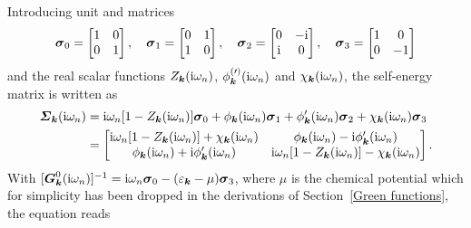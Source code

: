 Introducing unit and  matrices
%
\begin{equation*}
    \boldsymbol \sigma_0 =
    \begin{bmatrix}
        1 & 0 \\
        0 & 1
    \end{bmatrix},
    \quad
    \boldsymbol \sigma_1 =
    \begin{bmatrix}
        0 & 1 \\
        1 & 0
    \end{bmatrix},
    \quad
    \boldsymbol \sigma_2 =
    \begin{bmatrix}
        0 & -\mathrm i \\
        \mathrm i & 0
    \end{bmatrix},
    \quad
    \boldsymbol \sigma_3 =
    \begin{bmatrix}
    1 & 0 \\
    0 & -1
    \end{bmatrix}
\end{equation*}
%
and the real scalar functions $Z_{\boldsymbol k}(\mathrm i \omega_n)$, $\phi^{(\prime)}_{\boldsymbol
k}(\mathrm i \omega_n)$ and $\chi_{\boldsymbol k}(\mathrm i \omega_n)$, the self-energy matrix is
written as
%
\begin{align} \label{self-energy matrix}
    \boldsymbol {\varSigma}_{\boldsymbol k}(\mathrm i \omega_n) &= \mathrm i \omega_n
    [1 - Z_{\boldsymbol k}(\mathrm i \omega_n)] \boldsymbol \sigma_0
    + \phi _{\boldsymbol k}(\mathrm i \omega_n) \boldsymbol \sigma_1
    + \phi'_{\boldsymbol k}(\mathrm i \omega_n) \boldsymbol \sigma_2
    + \chi _{\boldsymbol k}(\mathrm i \omega_n) \boldsymbol \sigma_3
    \\ \notag
    &=
    \begin{bmatrix}
        \mathrm i \omega_n [1 - Z_{\boldsymbol k}(\mathrm i \omega_n)] + \chi_{\boldsymbol k}(\mathrm i \omega_n) &
        \phi_{\boldsymbol k}(\mathrm i \omega_n) - \mathrm i \phi'_{\boldsymbol k}(\mathrm i \omega_n) \\
        \phi_{\boldsymbol k}(\mathrm i \omega_n) + \mathrm i \phi'_{\boldsymbol k}(\mathrm i \omega_n) &
        \mathrm i \omega_n [1 - Z_{\boldsymbol k}(\mathrm i \omega_n)] - \chi_{\boldsymbol k}(\mathrm i \omega_n)
    \end{bmatrix}.
\end{align}
%
With $[\boldsymbol G^0_{\boldsymbol k}(\mathrm i \omega_n)]^{-1} = \mathrm i \omega_n \boldsymbol \sigma_0 -
(\varepsilon_{\boldsymbol k} - \mu) \boldsymbol \sigma_3$, where $\mu$ is the chemical potential
which for simplicity has been dropped in the derivations of Section~\ref{Green
functions}, the  equation reads
%
